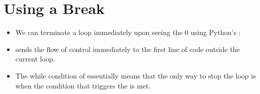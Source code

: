 \documentclass[letterpaper,10pt,english]{sphinxmanual}
\begin{document}
\section{Using a Break}
\label{\detokenize{lecture_notes/lec12_loops2_for_double:using-a-break}}\begin{itemize}
\item {} 
We can terminate a loop immediately upon seeing the 0 using
Python’s :

\begin{sphinxVerbatim}[commandchars=\\\{\}]
  
 
      
       
      

\end{sphinxVerbatim}

\item {} 
 sends the flow of control immediately to the first line of code
outside the current loop.

\item {} 
The while condition of  essentially means that the only way
to stop the loop is when the condition that triggers the  is
met.

\end{itemize}
\end{document}

